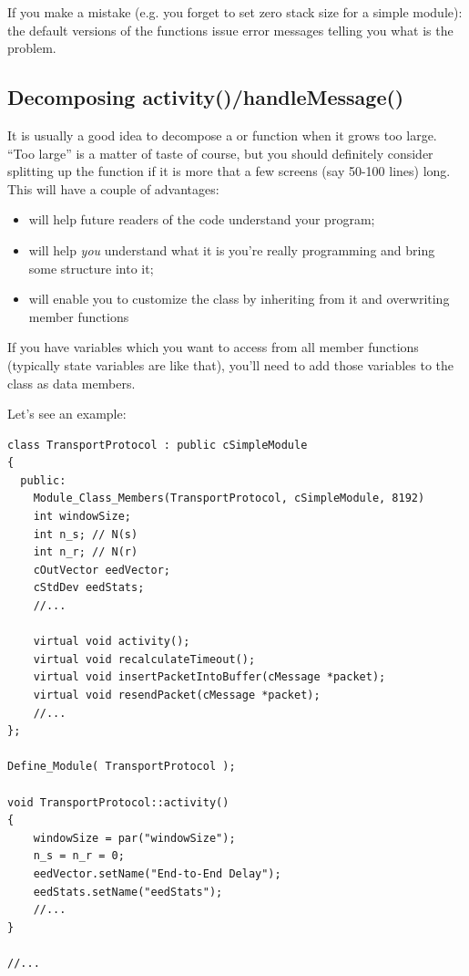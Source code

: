 If you make a mistake (e.g. you forget to set zero stack size
 for a 
simple module): the default versions of the
functions issue error messages telling you what is the problem.





\subsection{Decomposing activity()/handleMessage()}

It is usually a good idea to decompose a  or
 function when it grows too large. ``Too
large'' is a matter of taste of course, but you should definitely
consider splitting up the function if it is more that a few screens
(say 50-100 lines) long. This will have a couple of advantages:
\begin{itemize}
\item{will help future readers of the code understand your program;}
\item{will help \textit{you} understand what it is you're really programming
and bring some structure into it;}
\item{will enable you to customize the class by inheriting from it and
    overwriting member functions}
\end{itemize}

If you have variables which you want to access from all member
functions (typically state variables are like that), you'll need to
add those variables to the class as data members.

Let's see an example:

\begin{verbatim}
class TransportProtocol : public cSimpleModule
{
  public:
    Module_Class_Members(TransportProtocol, cSimpleModule, 8192)
    int windowSize;
    int n_s; // N(s)
    int n_r; // N(r)
    cOutVector eedVector;
    cStdDev eedStats;
    //...

    virtual void activity();
    virtual void recalculateTimeout();
    virtual void insertPacketIntoBuffer(cMessage *packet);
    virtual void resendPacket(cMessage *packet);
    //...
};

Define_Module( TransportProtocol );

void TransportProtocol::activity()
{
    windowSize = par("windowSize");
    n_s = n_r = 0;
    eedVector.setName("End-to-End Delay");
    eedStats.setName("eedStats");
    //...
}

//...
\end{verbatim}

